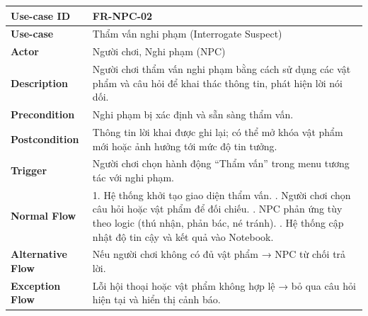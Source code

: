 \begin{table}[H]
\centering
\begin{tabular}{|p{4cm}|p{10cm}|}
\hline
\textbf{Use-case ID} & FR-NPC-02 \\ \hline
\textbf{Use-case} & Thẩm vấn nghi phạm (Interrogate Suspect) \\ \hline
\textbf{Actor} & Người chơi, Nghi phạm (NPC) \\ \hline
\textbf{Description} & Người chơi thẩm vấn nghi phạm bằng cách sử dụng các vật phẩm và câu hỏi để khai thác thông tin, phát hiện lời nói dối. \\ \hline
\textbf{Precondition} & Nghi phạm bị xác định và sẵn sàng thẩm vấn. \\ \hline
\textbf{Postcondition} & Thông tin lời khai được ghi lại; có thể mở khóa vật phẩm mới hoặc ảnh hưởng tới mức độ tin tưởng. \\ \hline
\textbf{Trigger} & Người chơi chọn hành động “Thẩm vấn” trong menu tương tác với nghi phạm. \\ \hline
\textbf{Normal Flow} &
1. Hệ thống khởi tạo giao diện thẩm vấn. \newline
2. Người chơi chọn câu hỏi hoặc vật phẩm để đối chiếu. \newline
3. NPC phản ứng tùy theo logic (thú nhận, phản bác, né tránh). \newline
4. Hệ thống cập nhật độ tin cậy và kết quả vào Notebook. \\ \hline
\textbf{Alternative Flow} &
Nếu người chơi không có đủ vật phẩm → NPC từ chối trả lời. \\ \hline
\textbf{Exception Flow} &
Lỗi hội thoại hoặc vật phẩm không hợp lệ → bỏ qua câu hỏi hiện tại và hiển thị cảnh báo. \\ \hline
\end{tabular}
\end{table}

